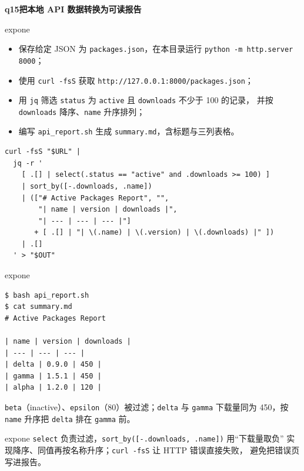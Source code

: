 \documentclass[11pt,a4paper,fontset=none]{ctexart}
\newcommand{\hwbanner}[3]{%
  \par\vspace{1.1em}
  \begin{tcolorbox}[enhanced, colback=#1!8, colframe=#1!75!black,
    boxrule=0.8pt, arc=2pt, left=7pt, right=7pt, top=4pt, bottom=4pt,
    before skip=1.1em]
    {\bfseries\color{#1!75!black}#2\qquad #3}
  \end{tcolorbox}
  \par\vspace{0.1em}\noindent\ignorespaces
}
\newcommand{\sublabel}[2]{%
  \par\vspace{0.8em}\noindent{\bfseries\color{#1!75!black}#2}\par\nobreak\vspace{0.25em}\noindent\ignorespaces
}
\begin{document}
\hwbanner{expone}{q15}{把本地 API 数据转换为可读报告}
\begin{reqbox}{expone}
\begin{itemize}[leftmargin=1.4em, itemsep=1pt]
  \item 保存给定 JSON 为 \texttt{packages.json}，在本目录运行 \texttt{python -m http.server 8000}；
  \item 使用 \texttt{curl -fsS} 获取 \texttt{http://127.0.0.1:8000/packages.json}；
  \item 用 \texttt{jq} 筛选 \texttt{status} 为 \texttt{active} 且 \texttt{downloads} 不少于 100 的记录，
        并按 \texttt{downloads} 降序、\texttt{name} 升序排列；
  \item 编写 \texttt{api\_report.sh} 生成 \texttt{summary.md}，含标题与三列表格。
\end{itemize}
\end{reqbox}
\sublabel{expone}{\faCode\ 报告脚本（\texttt{q15/api\_report.sh}）}
\begin{lstlisting}[style=shell]
curl -fsS "$URL" |
  jq -r '
    [ .[] | select(.status == "active" and .downloads >= 100) ]
    | sort_by([-.downloads, .name])
    | (["# Active Packages Report", "",
        "| name | version | downloads |",
        "| --- | --- | --- |"]
       + [ .[] | "| \(.name) | \(.version) | \(.downloads) |" ])
    | .[]
  ' > "$OUT"
\end{lstlisting}
\begin{resbox}{expone}
\begin{lstlisting}[style=output]
$ bash api_report.sh
$ cat summary.md
# Active Packages Report

| name | version | downloads |
| --- | --- | --- |
| delta | 0.9.0 | 450 |
| gamma | 1.5.1 | 450 |
| alpha | 1.2.0 | 120 |
\end{lstlisting}
\texttt{beta}（inactive）、\texttt{epsilon}（80）被过滤；\texttt{delta} 与
\texttt{gamma} 下载量同为 450，按 \texttt{name} 升序把 \texttt{delta} 排在
\texttt{gamma} 前。
\end{resbox}
\begin{trapbox}{expone}
  \texttt{select} 负责过滤，\texttt{sort\_by([-.downloads, .name])} 用“下载量取负”
  实现降序、同值再按名称升序；\texttt{curl -fsS} 让 HTTP 错误直接失败，
  避免把错误页写进报告。
\end{trapbox}
\end{document}
